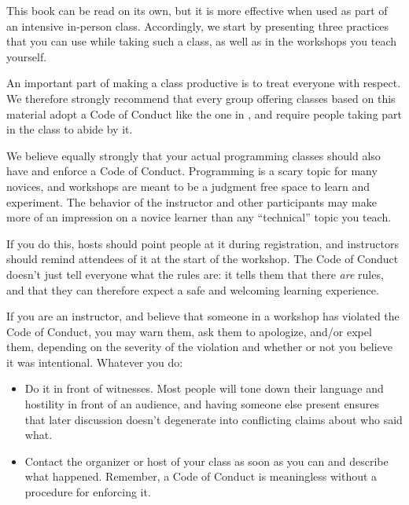 
This book can be read on its own, but it is more effective when used
as part of an intensive in-person class.  Accordingly, we start by
presenting three practices that you can use while taking such a class,
as well as in the workshops you teach yourself.


An important part of making a class productive is to treat everyone
with respect.  We therefore strongly recommend that every group
offering classes based on this material adopt a Code of Conduct like
the one in , and require people taking part in the
class to abide by it.

We believe equally strongly that your actual programming classes
should also have and enforce a Code of Conduct.  Programming is a
scary topic for many novices, and workshops are meant to be a judgment
free space to learn and experiment. The behavior of the instructor and
other participants may make more of an impression on a novice learner
than any ``technical'' topic you teach.

If you do this, hosts should point people at it during registration,
and instructors should remind attendees of it at the start of the
workshop. The Code of Conduct doesn't just tell everyone what the
rules are: it tells them that there \emph{are} rules, and that they
can therefore expect a safe and welcoming learning experience.

If you are an instructor, and believe that someone in a workshop has
violated the Code of Conduct, you may warn them, ask them to
apologize, and/or expel them, depending on the severity of the
violation and whether or not you believe it was intentional.  Whatever
you do:

\begin{itemize}

\item
  Do it in front of witnesses.  Most people will tone down their
  language and hostility in front of an audience, and having someone
  else present ensures that later discussion doesn't degenerate into
  conflicting claims about who said what.

\item
  Contact the organizer or host of your class as soon as you can and
  describe what happened.  Remember, a Code of Conduct is meaningless
  without a procedure for enforcing it.

\end{itemize}


